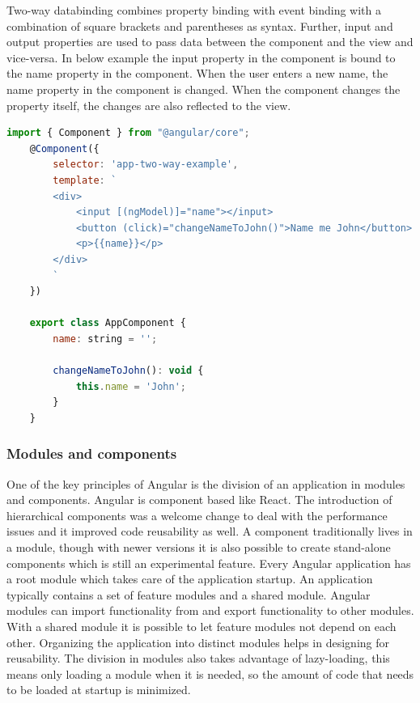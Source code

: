 Two-way databinding combines property binding with event binding with a combination of square brackets and parentheses as syntax. Further, input and output properties are used to pass data between the component and the view and vice-versa. In below example the input property in the component is bound to the name property in the component. When the user enters a new name, the name property in the component is changed. When the component changes the property itself, the changes are also reflected to the view.
\autocite{Goudar2019}
\begin{lstlisting}[language=Javascript]
	import { Component } from "@angular/core";
	@Component({
		selector: 'app-two-way-example',
		template: `
		<div>
			<input [(ngModel)]="name"></input>
			<button (click)="changeNameToJohn()">Name me John</button>
			<p>{{name}}</p>
		</div>
		`
	})
	
	export class AppComponent {
		name: string = '';
		
		changeNameToJohn(): void {
			this.name = 'John';
		}
	}
\end{lstlisting}


\subsubsection{Modules and components}
One of the key principles of Angular is the division of an application in modules and components.
Angular is component based like React. The introduction of hierarchical components was a welcome change to deal with the performance issues and it improved code reusability as well. A component traditionally lives in a module, though with newer versions it is also possible to create stand-alone components which is still an experimental feature.
Every Angular application has a root module which takes care of the application startup. An application typically contains a set of feature modules and a shared module. Angular modules can import functionality from and export functionality to other modules. With a shared module it is possible to let feature modules not depend on each other. Organizing the application into distinct modules helps in designing for reusability. The division in modules also takes advantage of lazy-loading, this means only loading a module when it is needed, so the amount of code that needs to be loaded at startup is minimized. 
\autocite{Angular.io}

